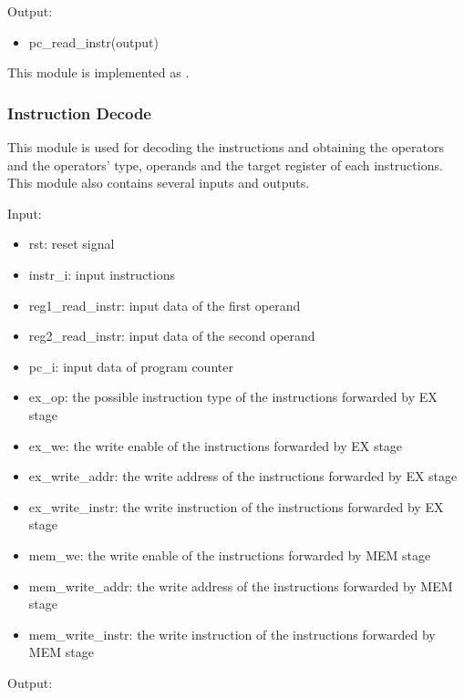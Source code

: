 \documentclass{article}
\begin{document}
Output:

\begin{itemize}
\item pc\_read\_instr(output)
\end{itemize}

This module is implemented as .

\subsubsection{Instruction Decode}
This module is used for decoding the instructions and obtaining the operators and the operators' type, operands and the target register of each instructions. This module also contains several inputs and outputs.

Input:

\begin{itemize}
\item rst: reset signal
\item instr\_i: input instructions
\item reg1\_read\_instr: input data of the first operand
\item reg2\_read\_instr: input data of the second operand
\item pc\_i: input data of program counter
\item ex\_op: the possible instruction type of the instructions forwarded by EX stage
\item ex\_we: the write enable of the instructions forwarded by EX stage
\item ex\_write\_addr: the write address of the instructions forwarded by EX stage
\item ex\_write\_instr: the write instruction of the instructions forwarded by EX stage
\item mem\_we: the write enable of the instructions forwarded by MEM stage
\item mem\_write\_addr: the write address of the instructions forwarded by MEM stage
\item mem\_write\_instr: the write instruction of the instructions forwarded by MEM stage
\end{itemize}

Output:
\end{document}
